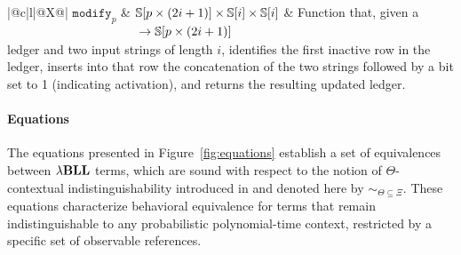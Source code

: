\begin{footnotesize}
\begin{xltabular}{\textwidth}{|@{\hskip 1.5pt}c|l|@{\hskip 1.5pt}X@{\hskip 1.5pt}|}
    $\mathtt{modify}_p$ &
    $\begin{aligned}[t]
        &\mathbb{S}[p\times(2i+1)] \times \mathbb{S}[i] \times \mathbb{S}[i] \\ 
        &\to \mathbb{S}[p\times(2i+1)]
    \end{aligned}$ & 
    Function that, given a ledger and two input strings of length $i$, identifies the first inactive row in the ledger, inserts into that row the concatenation of the two strings followed by a bit set to 1 (indicating activation), and returns the resulting updated ledger. \\ \hline
    
    \noalign{\smallskip}
    \noalign{\smallskip}
    \noalign{\smallskip}
    \noalign{\smallskip}
    \noalign{\smallskip}
    \caption{Table of function symbols and their interpretations as presented in \cite{lago2024-extended}.}
    \label{table:function-symbols}
\end{xltabular}
\end{footnotesize}

\paragraph{Equations}
The equations presented in Figure~\ref{fig:equations} establish a set of equivalences between ${\lambda}\mathbf{BLL}$ terms, which are sound with respect to the notion of $\Theta$-contextual indistinguishability introduced in \cite{lago2024-extended} and denoted here by $\sim_{\Theta\subseteq\Xi}$. These equations characterize behavioral equivalence for terms that remain indistinguishable to any probabilistic polynomial-time context, restricted by a specific set of observable references.

